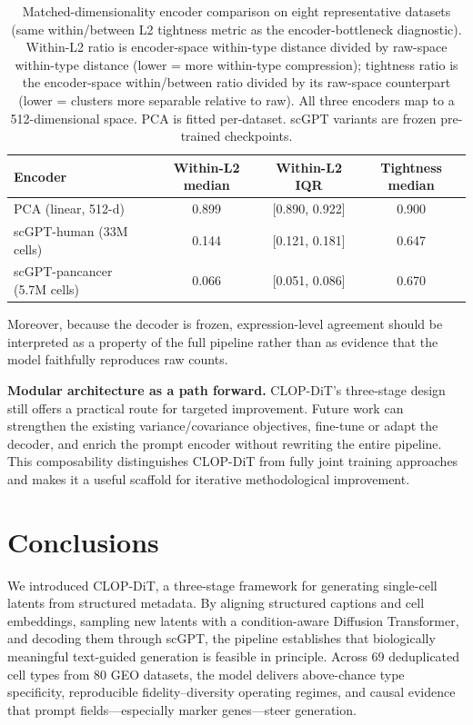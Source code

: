 \documentclass[11pt,a4paper]{article}
\begin{document}
\begin{table}[!htbp]
\caption{Matched-dimensionality encoder comparison on eight representative datasets (same within/between L2 tightness metric as the encoder-bottleneck diagnostic). Within-L2 ratio is encoder-space within-type distance divided by raw-space within-type distance (lower = more within-type compression); tightness ratio is the encoder-space within/between ratio divided by its raw-space counterpart (lower = clusters more separable relative to raw). All three encoders map to a 512-dimensional space. PCA is fitted per-dataset. scGPT variants are frozen pre-trained checkpoints.\label{tab:encoder-comparison}}
\centering
\begingroup
\footnotesize
\setlength{\tabcolsep}{4pt}
\begin{tabular}{@{}lccc@{}}
\toprule
\textbf{Encoder} & \textbf{Within-L2 median} & \textbf{Within-L2 IQR} & \textbf{Tightness median} \\
\midrule
PCA (linear, 512-d) & 0.899 & [0.890, 0.922] & 0.900 \\
scGPT-human (33M cells) & 0.144 & [0.121, 0.181] & 0.647 \\
scGPT-pancancer (5.7M cells) & 0.066 & [0.051, 0.086] & 0.670 \\
\bottomrule
\end{tabular}
\endgroup
\end{table}

Moreover, because the decoder is frozen, expression-level agreement should be interpreted as a property of the full pipeline rather than as evidence that the model faithfully reproduces raw counts.

\textbf{Modular architecture as a path forward.} CLOP-DiT's three-stage design still offers a practical route for targeted improvement. Future work can strengthen the existing variance/covariance objectives, fine-tune or adapt the decoder, and enrich the prompt encoder without rewriting the entire pipeline. This composability distinguishes CLOP-DiT from fully joint training approaches~\cite{ref-scdesign3} and makes it a useful scaffold for iterative methodological improvement.

\section{Conclusions}\label{sec:conclusions}

We introduced CLOP-DiT, a three-stage framework for generating single-cell latents from structured metadata. By aligning structured captions and cell embeddings, sampling new latents with a condition-aware Diffusion Transformer, and decoding them through scGPT, the pipeline establishes that biologically meaningful text-guided generation is feasible in principle. Across 69 deduplicated cell types from 80 GEO datasets, the model delivers above-chance type specificity, reproducible fidelity--diversity operating regimes, and causal evidence that prompt fields---especially marker genes---steer generation.
\end{document}
